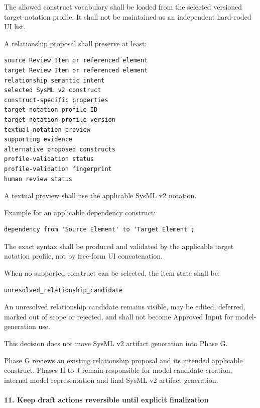 The allowed construct vocabulary shall be loaded from the selected versioned target-notation profile. It shall not be maintained as an independent hard-coded UI list.

A relationship proposal shall preserve at least:

\begin{verbatim}
source Review Item or referenced element
target Review Item or referenced element
relationship semantic intent
selected SysML v2 construct
construct-specific properties
target-notation profile ID
target-notation profile version
textual-notation preview
supporting evidence
alternative proposed constructs
profile-validation status
profile-validation fingerprint
human review status
\end{verbatim}

A textual preview shall use the applicable SysML v2 notation.

Example for an applicable dependency construct:

\begin{verbatim}
dependency from 'Source Element' to 'Target Element';
\end{verbatim}

The exact syntax shall be produced and validated by the applicable target notation profile, not by free-form UI concatenation.

When no supported construct can be selected, the item state shall be:

\begin{verbatim}
unresolved_relationship_candidate
\end{verbatim}

An unresolved relationship candidate remains visible, may be edited, deferred, marked out of scope or rejected, and shall not become Approved Input for model-generation use.

This decision does not move SysML v2 artifact generation into Phase G.

Phase G reviews an existing relationship proposal and its intended applicable construct. Phases H to J remain responsible for model candidate creation, internal model representation and final SysML v2 artifact generation.

\hypertarget{11-keep-draft-actions-reversible-until-explicit-finalization}{%
\paragraph{11. Keep draft actions reversible until explicit finalization}\label{11-keep-draft-actions-reversible-until-explicit-finalization}}

